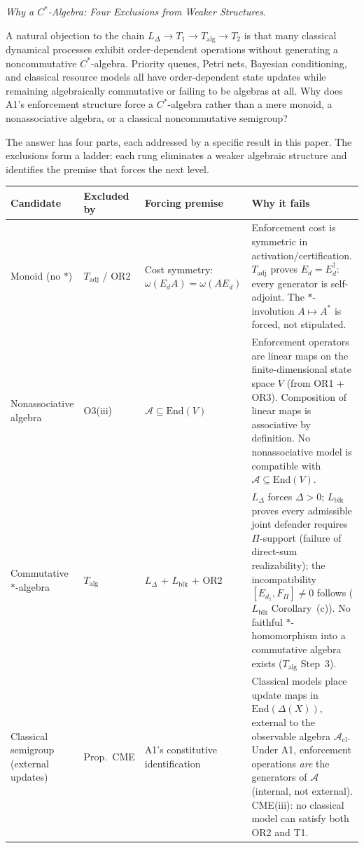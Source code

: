 \documentclass[11pt]{article}
\theoremstyle{remark}
\begin{document}
\medskip\noindent\textit{Why a $C^*$-Algebra: Four Exclusions from Weaker Structures.}
\label{box:algebraic_exclusions}

A natural objection to the chain $L_\Delta \to T_1 \to T_{\mathrm{alg}} \to T_2$ is that many classical dynamical processes exhibit order-dependent operations without generating a noncommutative $C^*$-algebra.  Priority queues, Petri nets, Bayesian conditioning, and classical resource models all have order-dependent state updates while remaining algebraically commutative or failing to be algebras at all.  Why does A1's enforcement structure force a $C^*$-algebra rather than a mere monoid, a nonassociative algebra, or a classical noncommutative semigroup?

The answer has four parts, each addressed by a specific result in this paper.  The exclusions form a ladder: each rung eliminates a weaker algebraic structure and identifies the premise that forces the next level.

\medskip
\begin{center}
\smallskip
\small
\begin{tabular}{@{}p{2.0cm}p{2.0cm}p{2.8cm}p{5.2cm}@{}}
\textbf{Candidate} & \textbf{Excluded by} & \textbf{Forcing premise} & \textbf{Why it fails} \\[2pt]
\hline\noalign{\smallskip}
Monoid (no $*$) & $T_{\mathrm{adj}}$ / OR2 & Cost symmetry: $\omega(E_d A) = \omega(A E_d)$ & Enforcement cost is symmetric in activation/certification.  $T_{\mathrm{adj}}$ proves $E_d = E_d^\dagger$: every generator is self-adjoint.  The $*$-involution $A \mapsto A^*$ is forced, not stipulated. \\[6pt]
Nonassociative algebra & O3(iii) & $\mathcal{A} \subseteq \mathrm{End}(V)$ & Enforcement operators are linear maps on the finite-dimensional state space $V$ (from OR1 + OR3).  Composition of linear maps is associative by definition.  No nonassociative model is compatible with $\mathcal{A} \subseteq \mathrm{End}(V)$. \\[6pt]
Commutative $*$-algebra & $T_{\mathrm{alg}}$ & $L_\Delta$ + $L_{\mathrm{blk}}$ + OR2 & $L_\Delta$ forces $\Delta > 0$; $L_{\mathrm{blk}}$ proves every admissible joint defender requires $\Pi$-support (failure of direct-sum realizability); the incompatibility $[E_{d_1}, F_\Pi] \ne 0$ follows ($L_{\mathrm{blk}}$ Corollary~(c)).  No faithful $*$-homomorphism into a commutative algebra exists ($T_{\mathrm{alg}}$ Step~3). \\[6pt]
Classical semigroup (external updates) & Prop.\ CME & A1's constitutive identification & Classical models place update maps in $\mathrm{End}(\Delta(X))$, external to the observable algebra $\mathcal{A}_{\mathrm{cl}}$.  Under A1, enforcement operations \emph{are} the generators of $\mathcal{A}$ (internal, not external).  CME(iii): no classical model can satisfy both OR2 and T1. \\
\end{tabular}
\label{tab:four_exclusions}
\end{center}
\end{document}
